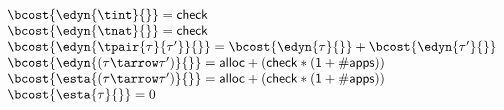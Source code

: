 \begin{flushleft}
$\begin{array}{l}
  \bcost{\edyn{\tint}{}} = \mathsf{check}
\\
  \bcost{\edyn{\tnat}{}} = \mathsf{check}
\\
  \bcost{\edyn{\tpair{\tau}{\tau'}}{}} = \bcost{\edyn{\tau}{}} + \bcost{\edyn{\tau'}{}}
\\
  \bcost{\edyn{(\tau\tarrow\tau')}{}} = \mathsf{alloc + (check * (1 + \#apps))}
\\
  \bcost{\esta{(\tau\tarrow\tau')}{}} = \mathsf{alloc + (check * (1 + \#apps))}
\\
  \bcost{\esta{\tau}{}} = 0
\end{array}$
\end{flushleft}
